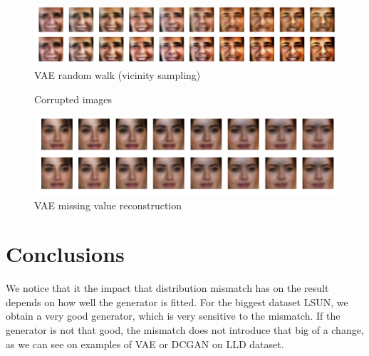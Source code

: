 \documentclass{article}
\begin{document}
\begin{center}
\begin{figure}
    \includegraphics[width=\linewidth]{report/vae_rw.png}
    \caption{VAE random walk (vicinity sampling)}
\end{figure}
\end{center}

\begin{figure}%
\centering
{}
\qquad
{}
\caption{Corrupted images}
\end{figure}

\begin{center}
\begin{figure}
    \includegraphics[width=\linewidth]{report/vae_missing_3.png}
    \caption{VAE missing value reconstruction}
\end{figure}
\end{center}

\section{Conclusions}
We notice that it the impact that distribution mismatch has on the result depends on how well the generator is fitted. For the biggest dataset LSUN, we obtain a very good generator, which is very sensitive to the mismatch. If the generator is not that good, the mismatch does not introduce that big of a change, as we can see on examples of VAE or DCGAN on LLD dataset.
\end{document}
